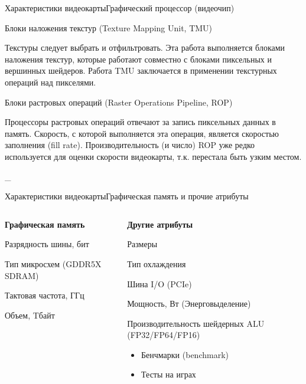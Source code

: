\documentclass{beamer}
\begin{document}
\begin{frame}{Характеристики видеокарты}{Графический процессор (видеочип)}
{		{\small
		Блоки наложения текстур (Texture Mapping Unit, TMU)
		}

		Текстуры следует выбрать и отфильтровать. Эта работа выполняется блоками наложения текстур, которые работают совместно с блоками пиксельных и вершинных шейдеров. 
		Работа TMU заключается в применении текстурных операций над пикселями.

		{\small
		Блоки растровых операций (Raster Operations Pipeline, ROP)
		}

		Процессоры растровых операций отвечают за запись пиксельных данных в память. Скорость, с которой выполняется эта операция, является скоростью заполнения (fill rate). 
		Производительность (и число) ROP уже редко используется для оценки скорости видеокарты, т.к. перестала быть узким местом. 

		\_
	}
	
\end{frame}

\begin{frame}{Характеристики видеокарты}{Графическая память и прочие атрибуты}
	\begin{columns}
		\begin{column}{0.5\textwidth}

			\textbf{Графическая память}
			
			Разрядность шины, бит
			
			Тип микросхем (GDDR5X SDRAM)
			
			Тактовая частота, ГГц
			
			Объем, Tбайт

			\vspace{25mm}
		\end{column}
		\begin{column}{0.5\textwidth}
			\textbf{Другие атрибуты}
			
			Размеры
			
			Тип охлаждения
			
			Шина I/O (PCIe)
			
			Мощность, Вт (Энерговыделение)
			
			Производительность шейдерных  ALU (FP32/FP64/FP16)
			\begin{itemize}
				\item 
				Бенчмарки (benchmark)
				\item 
				Тесты на играх
			\end{itemize}
			
		\end{column}
	\end{columns}
\end{frame}
\end{document}
